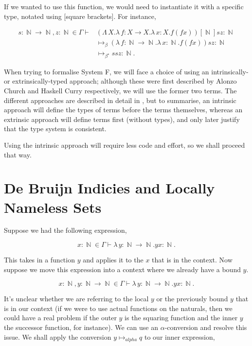 \documentclass[logo,bsc,singlespacing,parskip,online]{infthesis}
\DeclareMathOperator{\nat}{\mathbb{N}}
\begin{document}
If we wanted to use this function, we would need to instantiate it with a
specific type, notated using [square brackets]. For instance,

\begin{align*}
  s \colon \nat \to \nat, z \colon \nat \in \Gamma \vdash &(\Lambda \, X. \lambda \, f \colon X \to X . \lambda \, x \colon X . f (f x))[\nat] s z \colon \nat\\
  &\mapsto_{\beta} (\lambda \, f \colon \nat \to \nat . \lambda \, x \colon \nat . f (f x)) s z \colon \nat\\
  &\mapsto_{\beta^{\star}} s s z \colon \nat.
\end{align*}

When trying to formalise System F, we will face a choice of using an
intrinsically- or extrinsically-typed approach; although these were first
described by Alonzo Church and Haskell Curry respectively, we will use the
former two terms. The different approaches are described in detail in
\citet{gries_what_2003}, but to summarise, an intrinsic approach will define the
types of terms before the terms themselves, whereas an extrinsic approach will
define terms first (without types), and only later justify that the type system
is consistent.

Using the intrinsic approach will require less code and effort, so we shall
proceed that way.

\section{De Bruijn Indicies and Locally Nameless Sets}

Suppose we had the following expression,

\begin{equation*}
  x \colon \nat \in \Gamma \vdash \lambda \, y \colon \nat \to \nat. y x \colon \nat.
\end{equation*}

This takes in a function $y$ and applies it to the $x$ that is in the context.
Now suppose we move this expression into a context where we already have a bound
$y$.

\begin{equation*}
  x \colon \nat, y \colon \nat \to \nat \in \Gamma \vdash \lambda \, y \colon \nat \to \nat. y x \colon \nat.
\end{equation*}

It's unclear whether we are referring to the local $y$ or the previously bound
$y$ that is in our context (if we were to use actual functions on the naturals,
then we could have a real problem if the outer $y$ is the squaring function and
the inner $y$ the successor function, for instance). We can use an
$\alpha$-conversion and resolve this issue. We shall apply the conversion $y
\mapsto_{alpha} q$ to our inner expression,
\end{document}
